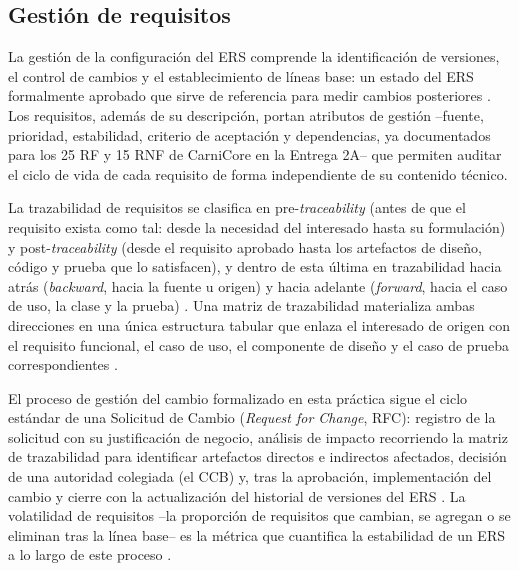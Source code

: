 \documentclass[11pt,a4paper]{article}
\begin{document}
\subsection{Gestión de requisitos}
La gestión de la configuración del ERS comprende la identificación de versiones, el control de cambios y el establecimiento de líneas base: un estado del ERS formalmente aprobado que sirve de referencia para medir cambios posteriores \cite{iso15288,pohl2010}. Los requisitos, además de su descripción, portan atributos de gestión --fuente, prioridad, estabilidad, criterio de aceptación y dependencias, ya documentados para los 25 RF y 15 RNF de CarniCore en la Entrega 2A-- que permiten auditar el ciclo de vida de cada requisito de forma independiente de su contenido técnico.

La trazabilidad de requisitos se clasifica en pre-\textit{traceability} (antes de que el requisito exista como tal: desde la necesidad del interesado hasta su formulación) y post-\textit{traceability} (desde el requisito aprobado hasta los artefactos de diseño, código y prueba que lo satisfacen), y dentro de esta última en trazabilidad hacia atrás (\textit{backward}, hacia la fuente u origen) y hacia adelante (\textit{forward}, hacia el caso de uso, la clase y la prueba) \cite{gotel1994traceability,clelandhuang2012traceability}. Una matriz de trazabilidad materializa ambas direcciones en una única estructura tabular que enlaza el interesado de origen con el requisito funcional, el caso de uso, el componente de diseño y el caso de prueba correspondientes \cite{wiegers2013softwarerequirements,clelandhuang2012traceability}.

El proceso de gestión del cambio formalizado en esta práctica sigue el ciclo estándar de una Solicitud de Cambio (\textit{Request for Change}, RFC): registro de la solicitud con su justificación de negocio, análisis de impacto recorriendo la matriz de trazabilidad para identificar artefactos directos e indirectos afectados, decisión de una autoridad colegiada (el CCB) y, tras la aprobación, implementación del cambio y cierre con la actualización del historial de versiones del ERS \cite{iso15288,pmbok2021,wiegers2013softwarerequirements}. La volatilidad de requisitos --la proporción de requisitos que cambian, se agregan o se eliminan tras la línea base-- es la métrica que cuantifica la estabilidad de un ERS a lo largo de este proceso \cite{pohl2010,wiegers2013softwarerequirements}.
\end{document}
